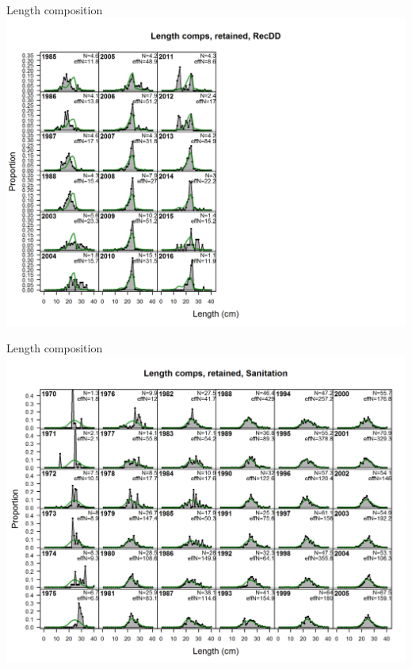 \documentclass[ignorenonframetext,compress]{beamer}
\begin{document}
\begin{frame}{Length composition}\includegraphics{./r4ss/plots_mod1/comp_lenfit_flt6mkt2.png}\end{frame}

\begin{frame}{Length composition}\includegraphics{./r4ss/plots_mod1/comp_lenfit_flt7mkt2_page1.png}\end{frame}
\end{document}
